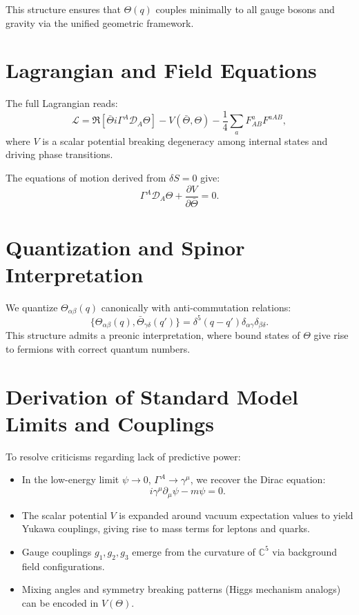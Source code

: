 \documentclass[12pt]{article}
\begin{document}
This structure ensures that \( \Theta(q) \) couples minimally to all gauge bosons and gravity via the unified geometric framework.

\section{Lagrangian and Field Equations}
The full Lagrangian reads:
\[
\mathcal{L} = \Re \left[ \bar{\Theta} i \Gamma^A \mathcal{D}_A \Theta \right] - V(\bar{\Theta}, \Theta) - \frac{1}{4} \sum_a F^a_{AB} F^{aAB},
\]
where \( V \) is a scalar potential breaking degeneracy among internal states and driving phase transitions.

The equations of motion derived from \( \delta S = 0 \) give:
\[
\Gamma^A \mathcal{D}_A \Theta + \frac{\partial V}{\partial \bar{\Theta}} = 0.
\]

\section{Quantization and Spinor Interpretation}
We quantize \( \Theta_{\alpha\beta}(q) \) canonically with anti-commutation relations:
\[ \{ \Theta_{\alpha\beta}(q), \bar{\Theta}_{\gamma\delta}(q') \} = \delta^5(q-q') \delta_{\alpha\gamma} \delta_{\beta\delta}. \]
This structure admits a preonic interpretation, where bound states of \( \Theta \) give rise to fermions with correct quantum numbers.

\section{Derivation of Standard Model Limits and Couplings}
To resolve criticisms regarding lack of predictive power:
\begin{itemize}
  \item In the low-energy limit \( \psi \rightarrow 0 \), \( \Gamma^A \rightarrow \gamma^\mu \), we recover the Dirac equation:
  \[ i \gamma^\mu \partial_\mu \psi - m \psi = 0. \]
  \item The scalar potential \( V \) is expanded around vacuum expectation values to yield Yukawa couplings, giving rise to mass terms for leptons and quarks.
  \item Gauge couplings \( g_1, g_2, g_3 \) emerge from the curvature of \( \mathbb{C}^5 \) via background field configurations.
  \item Mixing angles and symmetry breaking patterns (Higgs mechanism analogs) can be encoded in \( V(\Theta) \).
\end{itemize}
\end{document}
